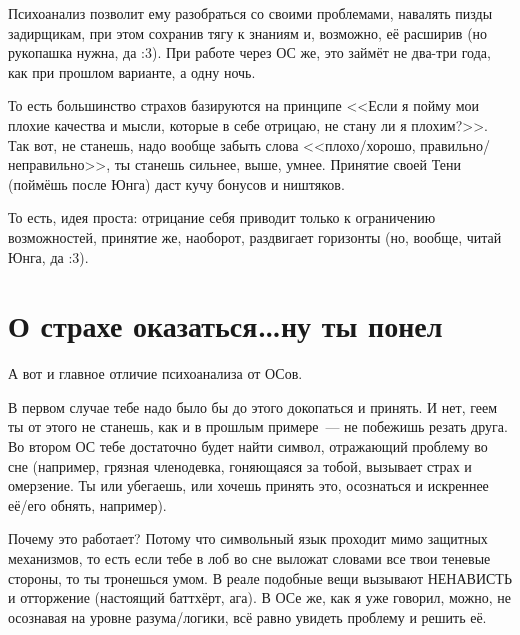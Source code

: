\documentclass[a4paper,14pt,oneside]{memoir}
\begin{document}
Психоанализ позволит ему разобраться со своими проблемами, навалять пизды задирщикам, при этом сохранив тягу к знаниям и, возможно, её расширив (но рукопашка нужна, да :3).
При работе через ОС же, это займёт не два-три года, как при прошлом варианте, а одну ночь.

То есть большинство страхов базируются на принципе <<Если я пойму мои плохие качества и мысли, которые в себе отрицаю, не стану ли я плохим?>>. Так вот, не станешь, надо вообще забыть слова <<плохо/хорошо, правильно/неправильно>>, ты станешь сильнее, выше, умнее. Принятие своей Тени (поймёшь после Юнга) даст кучу бонусов и ништяков. 

То есть, идея проста: отрицание себя приводит только к ограничению возможностей, принятие же, наоборот, раздвигает горизонты (но, вообще, читай Юнга, да :3).




\section{О страхе оказаться\ldots ну ты понел}

\medskip
А вот и главное отличие психоанализа от ОСов. 

В первом случае тебе надо было бы до этого докопаться и принять. И нет, геем ты от этого не станешь, как и в прошлым примере~--- не побежишь резать друга. Во втором ОС тебе достаточно будет найти символ, отражающий проблему во сне (например, грязная членодевка, гоняющаяся за тобой, вызывает страх и омерзение. Ты или убегаешь, или хочешь принять это, осознаться и искреннее её/его обнять, например).

Почему это работает? Потому что символьный язык проходит мимо защитных механизмов, то есть если тебе в лоб во сне выложат словами все твои теневые стороны, то ты тронешься умом. В реале подобные вещи вызывают НЕНАВИСТЬ и отторжение (настоящий баттхёрт, ага). В ОСе же, как я уже говорил, можно, не осознавая на уровне разума/логики, всё равно увидеть проблему и решить её. 
\end{document}
